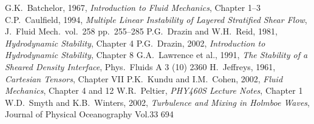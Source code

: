 \begin{thebibliography}{99}
 G.K.~Batchelor, 1967, \emph{Introduction to Fluid Mechanics},
Chapter 1--3
 C.P.~Caulfield, 1994, \emph{Multiple Linear
Instability of Layered Stratified Shear Flow}, J.~Fluid
Mech.~vol.~258 pp.~255--285
 P.G.~Drazin and W.H.~Reid, 1981, \emph{Hydrodynamic Stability},
Chapter 4
 P.G.~Drazin, 2002, \emph{Introduction to Hydrodynamic
Stability}, Chapter 8
 G.A.~Lawrence et al., 1991, \emph{The Stability of a Sheared Density Interface},
Phys.~Fluids A 3 (10) 2360
 H.~Jeffreys, 1961, \emph{Cartesian Tensors}, Chapter VII
 P.K.~Kundu and I.M.~Cohen, 2002, \emph{Fluid Mechanics}, Chapter
4 and 12
 W.R.~Peltier, \emph{PHY460S Lecture Notes}, Chapter 1
 W.D.~Smyth and K.B.~Winters, 2002, \emph{Turbulence and Mixing in Holmboe
Waves}, Journal of Physical Oceanography Vol.33 694
\end{thebibliography}
